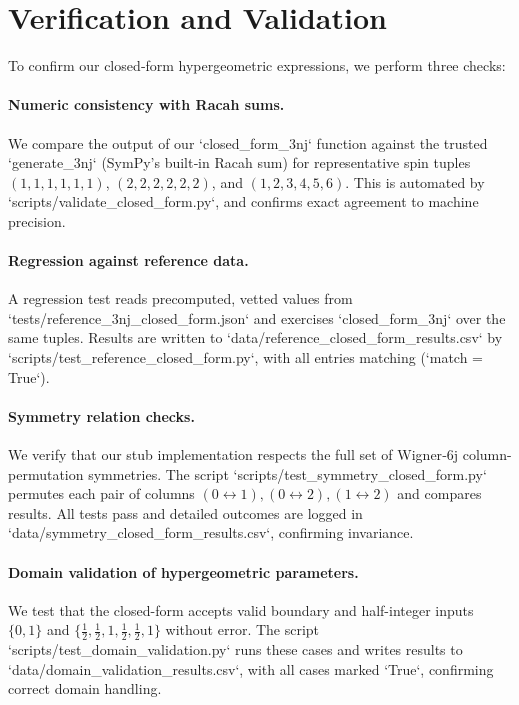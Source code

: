 \documentclass{article}
\begin{document}
\section*{Verification and Validation}

To confirm our closed‐form hypergeometric expressions, we perform three checks:

\paragraph{Numeric consistency with Racah sums.}
We compare the output of our `closed_form_3nj` function against the trusted
`generate_3nj` (SymPy’s built‐in Racah sum) for representative spin tuples
\((1,1,1,1,1,1)\), \((2,2,2,2,2,2)\), and \((1,2,3,4,5,6)\).
This is automated by `scripts/validate_closed_form.py`, and confirms exact agreement to machine precision.

\paragraph{Regression against reference data.}
A regression test reads precomputed, vetted values from
`tests/reference_3nj_closed_form.json` and exercises
`closed_form_3nj` over the same tuples.  Results are written to
`data/reference_closed_form_results.csv` by
`scripts/test_reference_closed_form.py`, with all entries matching (`match = True`).

\paragraph{Symmetry relation checks.}
We verify that our stub implementation respects the full set of Wigner‐6j
column-permutation symmetries.  The script
`scripts/test_symmetry_closed_form.py` permutes each pair of columns
\((0\!\leftrightarrow\!1), (0\!\leftrightarrow\!2), (1\!\leftrightarrow\!2)\)
and compares results.  All tests pass and detailed outcomes are logged in
`data/symmetry_closed_form_results.csv`, confirming invariance.
%
\paragraph{Domain validation of hypergeometric parameters.}
We test that the closed-form accepts valid boundary and half-integer inputs
\(\{0,1\}\) and \(\{\tfrac12,\tfrac12,1,\tfrac12,\tfrac12,1\}\) without error.
The script `scripts/test_domain_validation.py` runs these cases and writes
results to `data/domain_validation_results.csv`, with all cases marked `True`,
confirming correct domain handling.
\end{document}
